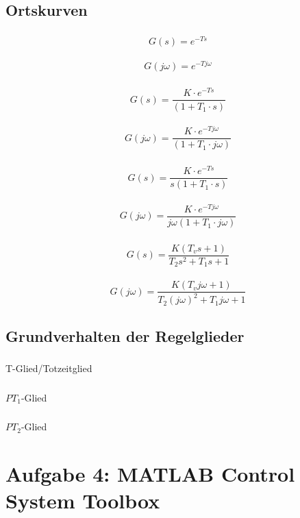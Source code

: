 \documentclass{article}
\begin{document}
		\subsection{Ortskurven}
			\subsubsection{}
				$$G(s) = e^{-Ts}$$
				\\
				$$G(j\omega) = e^{-Tj\omega}$$
			\subsubsection{}
				$$G(s) = \frac{K\cdot e^{-Ts}}{(1+T_1\cdot s)}$$
				\\
				$$G(j\omega) = \frac{K\cdot e^{-Tj\omega}}{(1+T_1\cdot j\omega)}$$
			\subsubsection{}
				$$G(s) = \frac{K\cdot e^{-Ts}}{s(1+T_1\cdot s)}$$
				\\
				$$G(j\omega) = \frac{K\cdot e^{-Tj\omega}}{j\omega(1+T_1\cdot j\omega)}$$
			\subsubsection{}
				$$G(s) = \frac{K(T_vs+1)}{T_2s^2 + T_1s + 1}$$
				\\
				$$G(j\omega) = \frac{K(T_vj\omega + 1)}{T_2(j\omega)^2 + T_1j\omega + 1}$$
		\newpage
		\subsection{Grundverhalten der Regelglieder}		
			\subsubsection{}
				T-Glied/Totzeitglied
			\subsubsection{}
				$PT_1$-Glied
			\subsubsection{}
				
			\subsubsection{}
				$PT_2$-Glied
	\newpage
	\section{Aufgabe 4: MATLAB Control System Toolbox}
	
\end{document}
